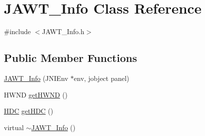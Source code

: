 \hypertarget{class_j_a_w_t___info}{\section{J\-A\-W\-T\-\_\-\-Info Class Reference}
\label{class_j_a_w_t___info}
}


{\ttfamily \#include $<$J\-A\-W\-T\-\_\-\-Info.\-h$>$}

\subsection*{Public Member Functions}
\begin{DoxyCompactItemize}
\item 
\hyperlink{class_j_a_w_t___info_a4e3733bebccef28b59e17dc9d540d46d}{J\-A\-W\-T\-\_\-\-Info} (J\-N\-I\-Env $\ast$env, jobject panel)
\item 
H\-W\-N\-D \hyperlink{class_j_a_w_t___info_a8a6d00ba985dd7fbeabc258bf5ec577e}{get\-H\-W\-N\-D} ()
\item 
\hyperlink{wglew_8h_a7b84f5391331438359747d138a86ffe3}{H\-D\-C} \hyperlink{class_j_a_w_t___info_a4a5091a3e36923c94d54760ebfa24e53}{get\-H\-D\-C} ()
\item 
virtual \hyperlink{class_j_a_w_t___info_a64c549b1f9c7454188fe9537ec48aa39}{$\sim$\-J\-A\-W\-T\-\_\-\-Info} ()
\end{DoxyCompactItemize}


